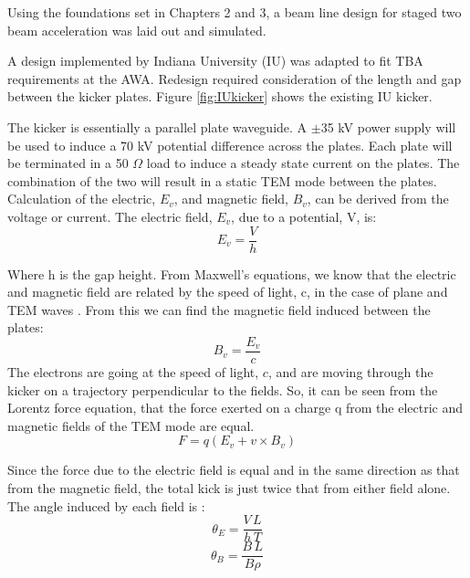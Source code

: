 
Using the foundations set in Chapters 2 and 3, 
a beam line design for staged 
two beam acceleration was laid out and simulated. 

A design implemented by Indiana University (IU) \cite{iukicker}
was adapted to fit TBA requirements at the AWA. Redesign required consideration
of the length and gap between the kicker plates.  Figure \ref{fig:IUkicker} shows the existing IU kicker.

The kicker is essentially a parallel plate waveguide. 
A $\pm$35 kV power supply will be used to induce a 70 kV potential difference 
across the plates. Each plate will be terminated in a 50 $\Omega$ load to induce a steady 
state current on the plates. The combination of the two will result in a static TEM mode 
between the plates. Calculation of the electric, $E_v$, and magnetic field, $B_v$,
can be derived from the voltage or current. The electric field, $E_v$, due to a potential, V, is: 
\begin{equation}
E_v=\frac{V}{h}
\end{equation}

Where h is the gap height. From Maxwell's equations, we know that the electric and magnetic 
field are related by the speed of light, c, in the case of plane and TEM waves \cite{pozar}. 
From this we can find the magnetic field induced between the plates: 
\begin{equation}
B_v=\frac{E_v}{c}
\end{equation}
The electrons are going at the speed of light, $c$, and are moving through the kicker on a 
trajectory perpendicular to the fields.  So, it can be seen from the Lorentz force equation, that the force 
exerted on a charge q from the electric and magnetic fields of the TEM mode are equal. 
\begin{equation}
F=q(E_v+v\times B_v)
\end{equation}

Since the force due to the electric field is equal and in the same direction as that from the magnetic field, 
the total kick is just twice that from either field alone.  The angle induced by each field is \cite{iukicker, Wiedemann}:  
\begin{equation}
\theta_E= \frac{V\,L}{h\,T}
\end{equation}
\begin{equation}
\theta_B= \frac{B\,L}{B\rho}
\end{equation}

